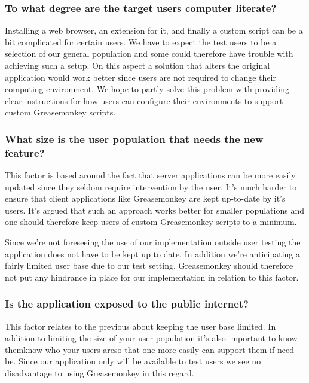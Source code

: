 \subsubsection{To what degree are the target users computer literate?}

Installing a web browser, an extension for it, and finally a custom script
can be a bit complicated for certain users. We have to expect the
test users to be a selection of our general population and some could
therefore have trouble with achieving such a setup. On this aspect
a solution that alters the original application would work better
since users are not required to change their computing environment.
We hope to partly solve this problem with providing clear instructions
for how users can configure their environments to support custom
Greasemonkey scripts.

\subsubsection{What size is the user population that needs the new feature?}

This factor is based around the fact that server applications can be more
easily updated since they seldom require intervention by the user. It's
much harder to ensure that client applications like Greasemonkey are
kept up-to-date by it's users. It's argued that such an approach works
better for smaller populations and one should therefore keep users
of custom Greasemonkey scripts to a minimum.

Since we're not foreseeing the use of our implementation outside user
testing the application does not have to be kept up to date. In addition
we're anticipating a fairly limited user base due to our test setting.
Greasemonkey should therefore not put any hindrance in place for
our implementation in relation to this factor.

\subsubsection{Is the application exposed to the public internet?}

This factor relates to the previous about keeping the user base limited.
In addition to limiting the size of your user population it's also
important to know them\dash{}know who your users are\dash{}so that
one more easily can support them if need be. Since our application
only will be available to test users we see no disadvantage to
using Greasemonkey in this regard.

